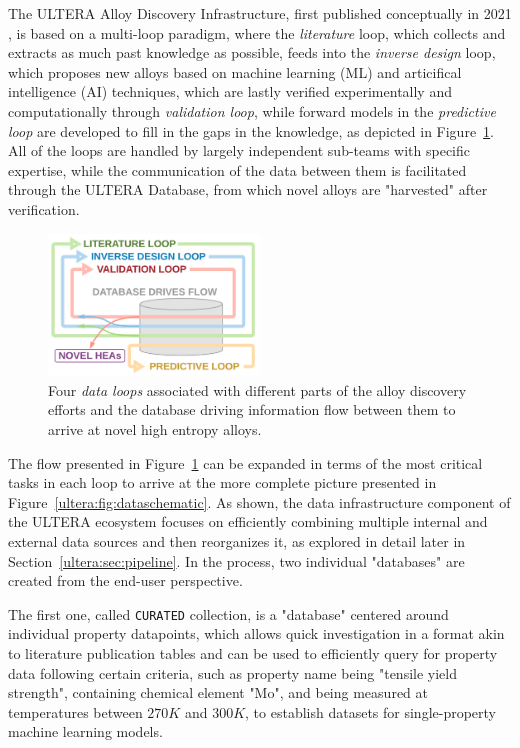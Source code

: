 The ULTERA Alloy Discovery Infrastructure, first published conceptually in 2021 \cite{Debnath2021GenerativeAlloys}, is based on a multi-loop paradigm, where the \emph{literature} loop, which collects and extracts as much past knowledge as possible, feeds into the \emph{inverse design} loop, which proposes new alloys based on machine learning (ML) and articifical intelligence (AI) techniques, which are lastly verified experimentally and computationally through \emph{validation loop}, while forward models in the \emph{predictive loop} are developed to fill in the gaps in the knowledge, as depicted in Figure~\ref{ultera:fig:dataloops}. All of the loops are handled by largely independent sub-teams with specific expertise, while the communication of the data between them is facilitated through the ULTERA Database, from which novel alloys are "harvested" after verification.

\begin{figure}[H]
    \centering
    \includegraphics[width=0.5\textwidth]{ultera/PersepctivePaper_DataFlow_V2.png}
    \caption{Four \emph{data loops} associated with different parts of the alloy discovery efforts and the database driving information flow between them to arrive at novel high entropy alloys.}
    \label{ultera:fig:dataloops}
\end{figure}

The flow presented in Figure~\ref{ultera:fig:dataloops} can be expanded in terms of the most critical tasks in each loop to arrive at the more complete picture presented in Figure~\ref{ultera:fig:dataschematic}. As shown, the data infrastructure component of the ULTERA ecosystem focuses on efficiently combining multiple internal and external data sources and then reorganizes it, as explored in detail later in Section~\ref{ultera:sec:pipeline}. In the process, two individual "databases" are created from the end-user perspective. 

The first one, called \texttt{CURATED} collection, is a "database" centered around individual property datapoints, which allows quick investigation in a format akin to literature publication tables and can be used to efficiently query for property data following certain criteria, such as property name being "tensile yield strength", containing chemical element "Mo", and being measured at temperatures between $270K$ and $300K$, to establish datasets for single-property machine learning models.

